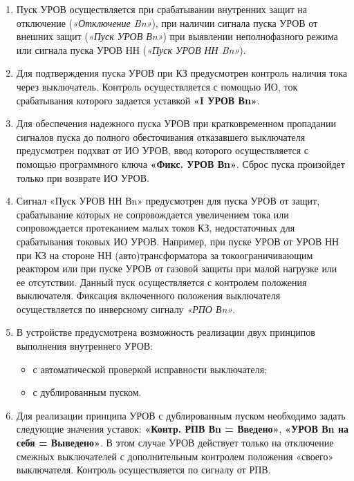 \begin{enumerate}[label=\arabic{section}.\arabic{subsection}.\arabic{enumi}, labelsep=4pt, leftmargin=0pt, itemindent=57pt, itemsep=0pt, parsep=5pt]
\begin{enumerate}[label=\arabic{section}.\arabic{subsection}.\arabic{enumi}.\arabic*, labelsep=4pt, leftmargin=0em, itemindent=65pt, parsep=0pt]
\item
Пуск УРОВ осуществляется при срабатывании внутренних защит на отключение (\textit{«Отключение Bn»}), при
наличии сигнала пуска УРОВ от внешних защит (\textit{«Пуск УРОВ Вn»}) при выявлении неполнофазного режима
или сигнала пуска УРОВ НН (\textit{«Пуск УРОВ НН Bn»}).

\item
Для подтверждения пуска УРОВ при КЗ предусмотрен контроль наличия тока через выключатель.
Контроль осуществляется с помощью ИО, ток срабатывания которого задается уставкой \textbf{«I УРОВ Вn»}.

\item
Для обеспечения надежного пуска УРОВ при кратковременном пропадании сигналов пуска до полного
обесточивания отказавшего выключателя предусмотрен подхват от ИО УРОВ, ввод которого осуществляется
с помощью программного ключа \textbf{«Фикс. УРОВ Вn»}. Сброс пуска произойдет только при возврате ИО УРОВ.

\item
Сигнал «Пуск УРОВ НН Вn» предусмотрен для пуска УРОВ от защит, срабатывание которых не
сопровождается увеличением тока или сопровождается протеканием малых токов КЗ, недостаточных для
срабатывания токовых ИО УРОВ. Например, при пуске УРОВ от УРОВ НН при КЗ на стороне НН
(авто)трансформатора за токоограничивающим реактором или при пуске УРОВ от газовой защиты при малой
нагрузке или ее отсутствии. Данный пуск осуществляется с контролем положения выключателя. Фиксация
включенного положения выключателя осуществляется по инверсному сигналу \textit{«РПО Вn»}.

\item
В устройстве предусмотрена возможность реализации двух принципов выполнения внутреннего УРОВ:
\begin{itemize}
\item с автоматической проверкой исправности выключателя;
\item с дублированным пуском.
\end{itemize}

\item
Для реализации принципа УРОВ с дублированным пуском необходимо задать следующие значения
уставок: \textbf{«Контр. РПВ Вn = Введено»}, \textbf{«УРОВ Вn на себя = Выведено»}. В этом случае УРОВ действует
только на отключение смежных выключателей с дополнительным контролем положения «своего»
выключателя. Контроль осуществляется по сигналу от РПВ.


\end{enumerate}
\end{enumerate}

